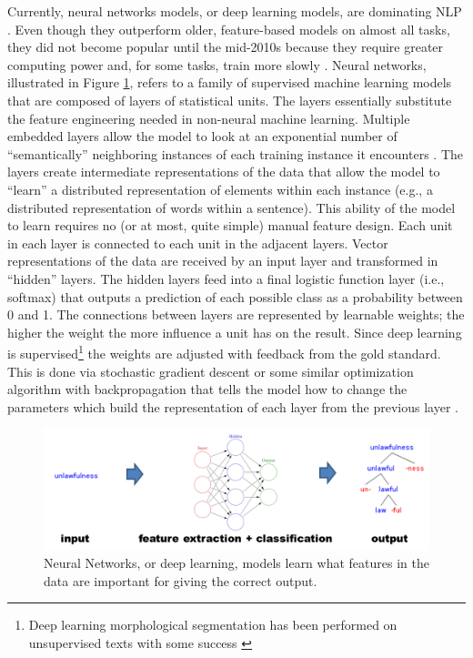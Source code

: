 Currently, neural networks models, or deep learning models,
are dominating NLP \citep{goldberg_neural_2017}.
Even though they outperform older, feature-based models on almost all tasks, they did not become popular until the mid-2010s because they require greater computing power and, for some tasks, train more slowly \citep{cotterell_cross-lingual_2017}. Neural networks, illustrated in Figure \ref{fig:DL}, refers to a family of supervised machine learning models that are composed of layers of statistical units. The layers essentially substitute the feature engineering needed in non-neural machine learning. Multiple embedded layers allow the model to look at an exponential number of ``semantically'' neighboring instances of each training instance it encounters \citep{bengio_neural_2003}. The layers create intermediate representations of the data that allow the model to ``learn'' a distributed representation of elements within each instance (e.g., a distributed representation of words within a sentence). This ability of the model to learn requires no (or at most, quite simple) manual feature design. Each unit in each layer is connected to each unit in the adjacent layers. Vector representations of the data are received by an input layer and transformed in ``hidden'' layers. The hidden layers feed into a final logistic function layer (i.e., softmax) that outputs a prediction of each possible class as a probability between 0 and 1. The connections between layers are represented by learnable weights; the higher the weight the more influence a unit has on the result. Since deep learning is supervised\footnote{Deep learning morphological segmentation has been performed on unsupervised texts with some success \citep{wang_morphological_2016}} the weights are adjusted with feedback from the gold standard. This is done via stochastic gradient descent or some similar optimization algorithm \citep{goldberg_neural_2017} with backpropagation that tells the model how to change the parameters which build the representation of each layer from the previous layer \citep{lecun_deep_2015}.

\begin{figure}[t]
\begin{center}
\includegraphics[width=0.95\columnwidth]{figs/DL.PNG}
\caption[Neural Networks]{Neural Networks, or deep learning, models learn what features in the data are important for giving the correct output.}
\label{fig:DL}
\end{center}
\end{figure}

